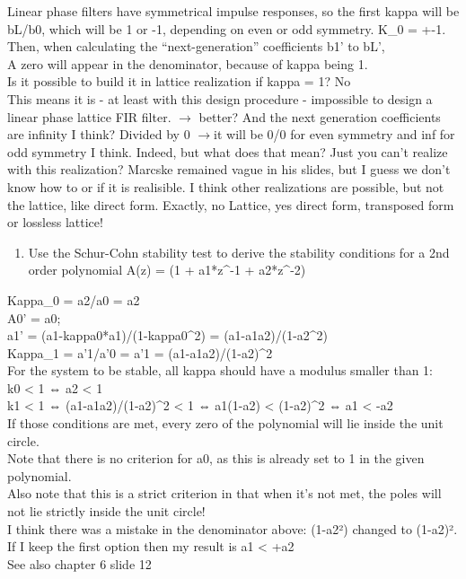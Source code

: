 \documentclass[
  a4paper,
  ,captions=tableheading
]{scrartcl}
\providecommand{\tightlist}{%
  \setlength{\itemsep}{0pt}\setlength{\parskip}{0pt}}
\begin{document}
Linear phase filters have symmetrical impulse responses, so the first
kappa will be bL/b0, which will be 1 or -1, depending on even or odd
symmetry. K\_0 = +-1. Then, when calculating the ``next-generation''
coefficients b1' to bL',\\
A zero will appear in the denominator, because of kappa being 1.\\
Is it possible to build it in lattice realization if kappa = 1? No\\
This means it is - at least with this design procedure - impossible to
design a linear phase lattice FIR filter. \(\rightarrow\) better? And
the next generation coefficients are infinity I think? Divided by 0
\(\rightarrow\)it will be 0/0 for even symmetry and inf for odd symmetry
I think. Indeed, but what does that mean? Just you can't realize with
this realization? Marcske remained vague in his slides, but I guess we
don't know how to or if it is realisible. I think other realizations are
possible, but not the lattice, like direct form. Exactly, no Lattice,
yes direct form, transposed form or lossless lattice!

\begin{enumerate}
\def\labelenumi{\arabic{enumi}.}
\setcounter{enumi}{4}
\tightlist
\item
  Use the Schur-Cohn stability test to derive the stability conditions
  for a 2nd order polynomial A(z) = (1 + a1*z\^{}-1 + a2*z\^{}-2)
\end{enumerate}

Kappa\_0 = a2/a0 = a2\\
A0' = a0;\\
a1' = (a1-kappa0*a1)/(1-kappa0\^{}2) = (a1-a1a2)/(1-a2\^{}2)\\
Kappa\_1 = a'1/a'0 = a'1 = (a1-a1a2)/(1-a2)\^{}2\\
For the system to be stable, all kappa should have a modulus smaller
than 1:\\
\textbar k0\textbar{} \textless{} 1 ⇔ \textbar a2\textbar{} \textless{}
1\\
\textbar k1\textbar{} \textless{} 1 ⇔
\textbar(a1-a1a2)/(1-a2)\^{}2\textbar{} \textless{} 1 ⇔
\textbar a1(1-a2)\textbar{} \textless{} \textbar(1-a2)\^{}2\textbar{} ⇔
\textbar a1\textbar{} \textless{} -a2\textbar{}\\
If those conditions are met, every zero of the polynomial will lie
inside the unit circle.\\
Note that there is no criterion for a0, as this is already set to 1 in
the given polynomial.\\
Also note that this is a strict criterion in that when it's not met, the
poles will not lie strictly inside the unit circle!\\
I think there was a mistake in the denominator above: (1-a2²) changed to
(1-a2)². If I keep the first option then my result is
\textbar a1\textbar{} \textless{} +a2\textbar{}\\
See also chapter 6 slide 12
\end{document}
